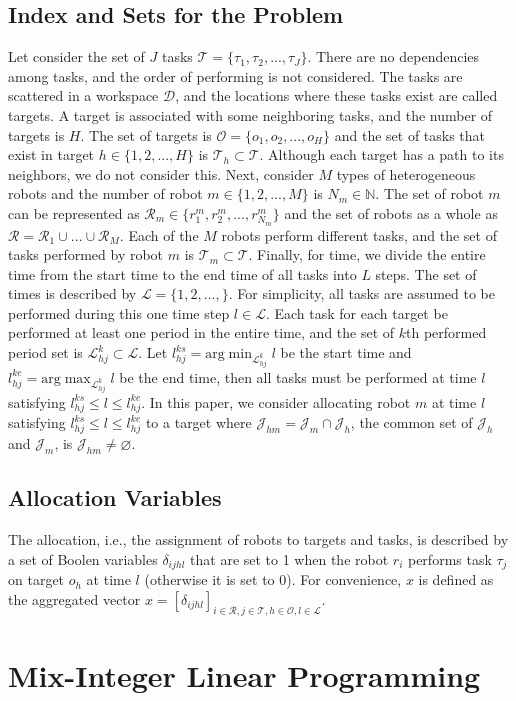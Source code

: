 \documentclass[]{interact}
\theoremstyle{plain}%
\theoremstyle{definition}
\theoremstyle{remark}
\begin{document}
\subsection{Index and Sets for the Problem}
Let consider the set of $J$ tasks $\mathcal{T}=\{\tau_1,\tau_2,...,\tau_J\}$. 
There are no dependencies among tasks, and the order of performing is not considered. 
The tasks are scattered in a workspace $\mathcal{D}$, and the locations where these tasks exist are called targets. 
A target is associated with some neighboring tasks, and the number of targets is $H$. 
The set of targets is $\mathcal{O} = \{o_1,o_2,...,o_H\}$ and the set of tasks that exist in target $h\in\{1,2,...,H\}$ is $\mathcal{T}_h\subset \mathcal{T}$. 
Although each target has a path to its neighbors, we do not consider this.
Next, consider $M$ types of heterogeneous robots and the number of robot $m\in\{1,2,...,M\}$ is $N_m\in\mathbb{N}$. 
The set of robot $m$ can be represented as $\mathcal{R}_m\in\{r^m_1,r^m_2,...,r^m_{N_m}\}$ and the set of robots as a whole as $\mathcal{R}=\mathcal{R}_1\cup ...\cup \mathcal{R}_M$. 
Each of the $M$ robots perform different tasks, and the set of tasks performed by robot $m$ is $\mathcal{T}_m\subset\mathcal{T}$. 
Finally, for time, we divide the entire time from the start time to the end time of all tasks into $L$ steps. 
The set of times is described by $\mathcal{L}=\{1,2,...,\}$.
For simplicity, all tasks are assumed to be performed during this one time step $l\in\mathcal{L}$.
Each task for each target be performed at least one period in the entire time, and the set of $k$th performed period set is $\mathcal{L}^k_{hj}\subset\mathcal{L}$. 
Let $l^{ks}_{hj} = \mathrm{arg}\min_{\mathcal{L}^k_{hj}} l$ be the start time and $l^{ke}_{hj} = \mathrm{arg}\max_{\mathcal{L}^k_{hj}} l$ be the end time, then all tasks must be performed at time $l$ satisfying $l^{ks}_{hj} \le l \le l^{ke}_{hj}$.
In this paper, we consider allocating robot $m$ at time $l$ satisfying $l^{ks}_{hj} \le l \le l^{ke}_{hj}$ to a target where $\mathcal{J}_{hm}=\mathcal{J}_{m}\cap\mathcal{J}_{h}$, the common set of $\mathcal{J}_h$ and $\mathcal{J}_m$, is $\mathcal{J}_{hm}\neq \varnothing$.

\subsection{Allocation Variables}
The allocation, i.e., the assignment of robots to targets and tasks, is described by a set of Boolen variables $\delta_{ijhl}$ that are set to 1 when the robot $r_i$ performs task $\tau_j$ on target $o_h$ at time $l$ (otherwise it is set to 0).
For convenience, $x$ is defined as the aggregated vector $x=[\delta_{ijhl}]_{i\in\mathcal{R},j\in\mathcal{T},h\in\mathcal{O},l\in\mathcal{L}}$.

\section{Mix-Integer Linear Programming}
\end{document}
